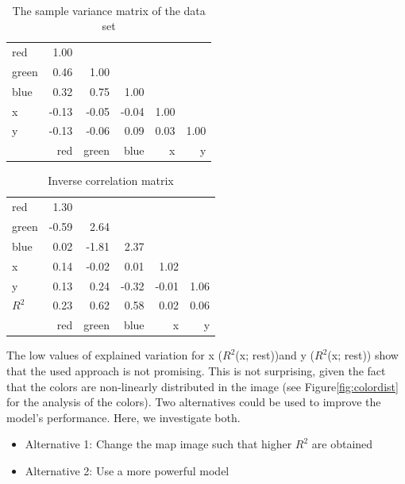 \documentclass{article}
\begin{document}
\begin{table}[h]
\  \centering
  \begin{tabular}{l|rrrrr}
    red   & 1.00  &       &       &      &      \\
    green & 0.46  & 1.00  &       &      &      \\
    blue  & 0.32  & 0.75  & 1.00  &      &      \\
    x     & -0.13 & -0.05 & -0.04 & 1.00 &      \\
    y     & -0.13 & -0.06 & 0.09  & 0.03 & 1.00 \\
    \midrule
          & red   & green & blue  & x    & y
  \end{tabular}
  \caption{The sample variance matrix of the data set}
\end{table}

\begin{table}                                   
\centering                                      
\begin{tabular}{l|rrrrr}                    
    red   & 1.30  &       &       &       &      \\  
    green & -0.59 & 2.64  &       &       &      \\
    blue  & 0.02  & -1.81 & 2.37  &       &      \\ 
    x     & 0.14  & -0.02 & 0.01  & 1.02  &      \\ 
    y     & 0.13  & 0.24  & -0.32 & -0.01 & 1.06 \\ 
  \midrule
  $R^2$   & 0.23  & 0.62  & 0.58  & 0.02  & 0.06 \\
  \midrule
          & red   & green & blue  & x     & y
\end{tabular}                                   
\caption{Inverse correlation matrix}                        
\label{table:MyTableLabel}                      
\end{table} 

The low values of explained variation for x ($R^2$(x; rest))and y
($R^2$(x; rest)) show that the used approach is not promising. This is
not surprising, given the fact that the colors are non-linearly
distributed in the image (see Figure\ref{fig:colordist} for the
analysis of the colors). Two alternatives could be used to improve the
model's performance. Here, we investigate both.
\begin{itemize}
\item Alternative 1: Change the map image such that higher $R^2$ are
  obtained
\item Alternative 2: Use a more powerful model
\end{itemize}
\end{document}

